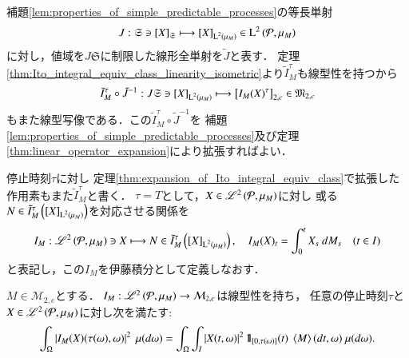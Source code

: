 	\begin{prf}
		補題\ref{lem:properties_of_simple_predictable_processes}の等長単射
		\begin{align}
			J:\mathfrak{S} \ni \left[X\right]_{\mathfrak{S}} \longmapsto \left[X\right]_{\operatorname{L}^{2} \left(\mu_M\right)} \in \operatorname{L}^{2} \left(\mathcal{P},\mu_M\right)
		\end{align}
		に対し，値域を$J\mathfrak{S}$に制限した線形全単射を$\tilde{J}$と表す．
		定理\ref{thm:Ito_integral_equiv_class_linearity_isometric}より$\tilde{I}^\tau_M$も線型性を持つから
		\begin{align}
			\tilde{I}^\tau_M \circ \tilde{J}^{-1}: J \mathfrak{S} \ni \left[X\right]_{\operatorname{L}^{2} \left(\mu_M\right)} \longmapsto \left[I_M(X)^\tau\right]_{2,c} \in \mathfrak{M}_{2,c}
		\end{align}
		もまた線型写像である．この$\tilde{I}^\tau_M \circ \tilde{J}^{-1}$を
		補題\ref{lem:properties_of_simple_predictable_processes}及び定理\ref{thm:linear_operator_expansion}により拡張すればよい．
		\QED
	\end{prf}
	
	\begin{screen}
		\begin{dfn}[伊藤積分の拡張]
			停止時刻$\tau$に対し
			定理\ref{thm:expansion_of_Ito_integral_equiv_class}で拡張した作用素もまた$\tilde{I}^\tau_M$と書く．
			$\tau = T$として，$X \in \mathscr{L}^{2} \left(\mathcal{P},\mu_M\right)$に対し
			或る$N \in \tilde{I}^\tau_M\left( \left[X\right]_{\operatorname{L}^{2} \left(\mu_M\right)} \right)$を対応させる関係を
			\begin{align}
				I_M: \mathscr{L}^{2} \left(\mathcal{P},\mu_M\right) \ni X \longmapsto N \in \tilde{I}^\tau_M\left( \left[X\right]_{\operatorname{L}^{2} \left(\mu_M\right)} \right), \quad
				I_M(X)_t = \int_0^t X_s\ d M_s \quad (t \in I)
			\end{align}
			と表記し，この$I_M$を伊藤積分として定義しなおす．
			\label{dfn:expansion_of_Ito_integral}
		\end{dfn}
	\end{screen}
	
	\begin{screen}
		\begin{thm}[拡張された伊藤積分の線型等長性]
			$M \in \mathcal{M}_{2,c}$とする．
			$I_M:\mathscr{L}^{2} \left(\mathcal{P},\mu_M\right) \rightarrow \mathcal{M}_{2,c}$は線型性を持ち，
			任意の停止時刻$\tau$と$X \in \mathscr{L}^{2} \left(\mathcal{P},\mu_M\right)$に対し次を満たす:
			\begin{align}
				\int_\Omega \left| I_M(X)(\tau(\omega),\omega) \right|^2\ \mu(d\omega)
				= \int_\Omega \int_I \left| X(t,\omega) \right|^2 \defunc_{[0,\tau(\omega)]}(t)\ \inprod<M>(dt,\omega)\ \mu(d\omega).
			\end{align}
			\label{thm:stopped_Ito_integral}
		\end{thm}
	\end{screen}
	
